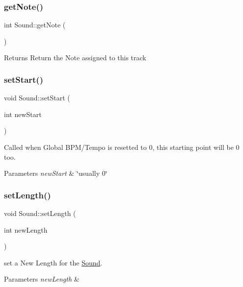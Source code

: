 \subsubsection{\texorpdfstring{getNote()}{getNote()}}
{\footnotesize\ttfamily int Sound\+::get\+Note (\begin{DoxyParamCaption}{ }\end{DoxyParamCaption})}

\begin{DoxyReturn}{Returns}
Return the Note assigned to this track 
\end{DoxyReturn}
\mbox{\label{class_sound_a461046367f146bb9e842a3ac36e144a3}} 
\subsubsection{\texorpdfstring{setStart()}{setStart()}}
{\footnotesize\ttfamily void Sound\+::set\+Start (\begin{DoxyParamCaption}\item[{int}]{new\+Start }\end{DoxyParamCaption})}

Called when Global B\+P\+M/\+Tempo is resetted to 0, this starting point will be 0 too. 
\begin{DoxyParams}{Parameters}
{\em new\+Start} & \char`\"{}usually 0\char`\"{} \\
\hline
\end{DoxyParams}
\mbox{\label{class_sound_a0dd61b160b0424f36f2d858667b52ea2}} 
\subsubsection{\texorpdfstring{setLength()}{setLength()}}
{\footnotesize\ttfamily void Sound\+::set\+Length (\begin{DoxyParamCaption}\item[{int}]{new\+Length }\end{DoxyParamCaption})}

set a New Length for the \mbox{\hyperlink{class_sound}{Sound}}. 
\begin{DoxyParams}{Parameters}
{\em new\+Length} & \\
\hline
\end{DoxyParams}
\mbox{\label{class_sound_aa5c37c27281ccf904f211229b1197469}} 
